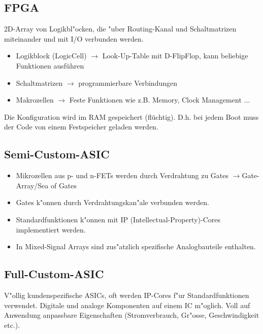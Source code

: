 \begin{scriptsize}
\begin{multicols}{2}
\subsection{FPGA}
2D-Array von Logikbl"ocken, die "uber Routing-Kanal und Schaltmatrizen miteinander und mit I/O verbunden werden.
\begin{itemize}
	\setlength{\itemsep}{1pt}
	\setlength{\parskip}{0pt}
	\setlength{\parsep}{0pt}
	
	\item Logikblock (LogicCell) $\rightarrow$ Look-Up-Table mit D-FlipFlop, kann beliebige Funktionen ausführen
	\item Schaltmatrizen $\rightarrow$ programmierbare Verbindungen
	\item Makrozellen $\rightarrow$ Feste Funktionen wie z.B. Memory, Clock Management ...
\end{itemize}
Die Konfiguration wird im RAM gespeichert (flüchtig). D.h. bei jedem Boot muss der Code von einem Festspeicher geladen werden.

\subsection{Semi-Custom-ASIC}
\begin{itemize}
	\setlength{\itemsep}{1pt}
	\setlength{\parskip}{0pt}
	\setlength{\parsep}{0pt}
	
	\item Mikrozellen aus p- und n-FETs werden durch Verdrahtung zu Gates 			
	$\rightarrow$Gate-Array/Sea of Gates
	\item Gates k"onnen durch Verdrahtungskan"ale verbunden werden.
	\item Standardfunktionen k"onnen mit IP (Intellectual-Property)-Cores implementiert werden.
	\item In Mixed-Signal Arrays sind zus"atzlich spezifische Analogbauteile enthalten.
\end{itemize}	

\subsection{Full-Custom-ASIC}
V"ollig kundenspezifische ASICs, oft werden IP-Cores f"ur Standardfunktionen verwendet. Digitale und analoge Komponenten auf einem IC m"oglich. Voll auf Anwendung anpassbare Eigenschaften (Stromverbrauch, Gr"osse, Geschwindigkeit etc.).
\end{multicols}
\end{scriptsize}

